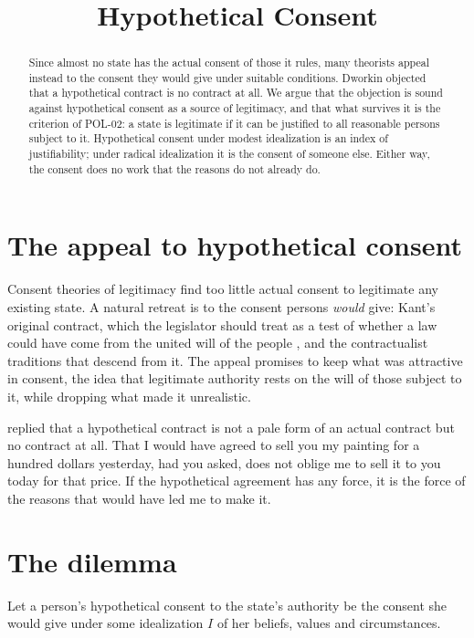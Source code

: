 \documentclass{situationist-preprint}
\title{Hypothetical Consent}
\begin{document}
\maketitle

\begin{abstract}
Since almost no state has the actual consent of those it rules, many theorists appeal instead to the consent they would give under suitable conditions. Dworkin objected that a hypothetical contract is no contract at all. We argue that the objection is sound against hypothetical consent as a source of legitimacy, and that what survives it is the criterion of POL-02: a state is legitimate if it can be justified to all reasonable persons subject to it. Hypothetical consent under modest idealization is an index of justifiability; under radical idealization it is the consent of someone else. Either way, the consent does no work that the reasons do not already do.
\end{abstract}

\section{The appeal to hypothetical consent}

Consent theories of legitimacy find too little actual consent to legitimate any existing state. A natural retreat is to the consent persons \emph{would} give: Kant's original contract, which the legislator should treat as a test of whether a law could have come from the united will of the people \citep{Kant1793}, and the contractualist traditions that descend from it. The appeal promises to keep what was attractive in consent, the idea that legitimate authority rests on the will of those subject to it, while dropping what made it unrealistic.

\citet{Dworkin1973} replied that a hypothetical contract is not a pale form of an actual contract but no contract at all. That I would have agreed to sell you my painting for a hundred dollars yesterday, had you asked, does not oblige me to sell it to you today for that price. If the hypothetical agreement has any force, it is the force of the reasons that would have led me to make it.

\section{The dilemma}

Let a person's hypothetical consent to the state's authority be the consent she would give under some idealization $I$ of her beliefs, values and circumstances.
\end{document}
